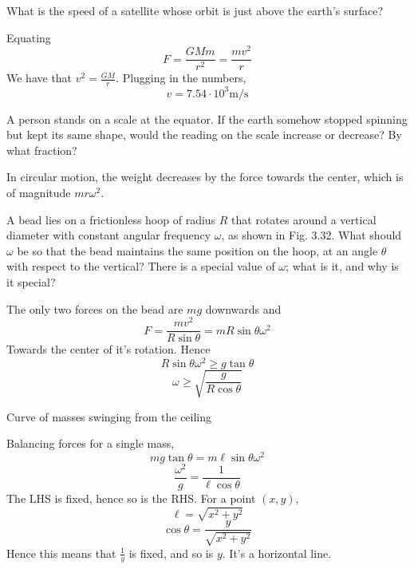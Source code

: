 \documentclass[11pt]{scrartcl}
\begin{document}
\begin{example}
  [3.51]
\end{example}
\begin{soln}

\end{soln}
\begin{example}
  [3.54]
  What is the speed of a satellite whose orbit is just above the earth’s
  surface?
\end{example}
\begin{soln}
  Equating
  $$F=\frac{GMm}{r^2}=\frac{mv^2}{r}$$
  We have that $v^2=\frac{GM}{r}$. Plugging in the numbers,
  $$v=7.54\cdot 10^3\mathrm{m}/\mathrm{s}$$
\end{soln}
\begin{example}
  [3.55]
  A person stands on a scale at the equator. If the earth somehow stopped
  spinning but kept its same shape, would the reading on the scale increase
  or decrease? By what fraction?
\end{example}
\begin{soln}
In circular motion, the weight decreases by the force towards the center,
which is of magnitude $mr\omega^2$.
\end{soln}
\begin{example}
  [3.56]
\end{example}
\begin{soln}
\end{soln}
\begin{example}
  [3.57]
  A bead lies on a frictionless hoop of radius $R$ that rotates around a vertical
  diameter with constant angular frequency $\omega$, as shown in Fig. 3.32. What
  should $\omega$ be so that the bead maintains the same position on the hoop,
  at an angle $\theta$ with respect to the vertical? There is a special value of $\omega$;
  what is it, and why is it special?
\end{example}
\begin{soln}
  The only two forces on the bead are $mg$ downwards and
  $$F=\frac{mv^2}{R\sin\theta}=mR\sin\theta\omega^2$$
  Towards the center of it's rotation. Hence
  $$R\sin\theta\omega^2\ge g\tan\theta$$
  $$\omega \ge \sqrt{\frac{g}{R\cos\theta}}$$
\end{soln}
\begin{example}
  [3.58]
  Curve of masses swinging from the ceiling
\end{example}
\begin{soln}
  Balancing forces for a single mass,
  $$mg\tan\theta=m\ell\sin\theta\omega^2$$
  $$\frac{\omega^2}{g}=\frac{1}{\ell \cos\theta}$$
  The LHS is fixed, hence so is the RHS. For a point $(x,y)$,
  $$\ell=\sqrt{x^2+y^2}$$
  $$\cos\theta=\frac{y}{\sqrt{x^2+y^2}}$$
  Hence this means that $\frac{1}{y}$ is fixed, and so is $y$. It's a horizontal line.

\end{soln}
\end{document}
